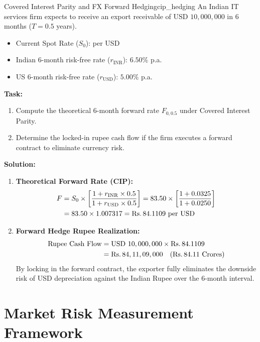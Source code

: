 \begin{example}{Covered Interest Parity and FX Forward Hedging}{cip_hedging}
An Indian IT services firm expects to receive an export receivable of $\text{USD } 10,000,000$ in 6 months ($T = 0.5$ years).
\begin{itemize}[leftmargin=1.5em, noitemsep]
    \item Current Spot Rate ($S_0$):  per USD
    \item Indian 6-month risk-free rate ($r_{\text{INR}}$): $6.50\%$ p.a.
    \item US 6-month risk-free rate ($r_{\text{USD}}$): $5.00\%$ p.a.
\end{itemize}

\textbf{Task:}
\begin{enumerate}[leftmargin=1.2em, itemsep=2pt]
    \item Compute the theoretical 6-month forward rate $F_{0, 0.5}$ under Covered Interest Parity.
    \item Determine the locked-in rupee cash flow if the firm executes a forward contract to eliminate currency risk.
\end{enumerate}

\textbf{Solution:}
\begin{enumerate}[leftmargin=1.2em, itemsep=2pt]
    \item \textbf{Theoretical Forward Rate (CIP):}
    \begin{align*}
    F &= S_0 \times \left[\frac{1 + r_{\text{INR}} \times 0.5}{1 + r_{\text{USD}} \times 0.5}\right] = 83.50 \times \left[\frac{1 + 0.0325}{1 + 0.0250}\right] \\
    &= 83.50 \times 1.007317 = \text{Rs.}\, 84.1109 \text{ per USD}
    \end{align*}
    \item \textbf{Forward Hedge Rupee Realization:}
    \begin{align*}
    \text{Rupee Cash Flow} &= \text{USD } 10,000,000 \times \text{Rs.}\, 84.1109 \\
    &= \text{Rs.}\, 84,11,09,000 \quad (\text{Rs.}\, 84.11 \text{ Crores})
    \end{align*}
    By locking in the forward contract, the exporter fully eliminates the downside risk of USD depreciation against the Indian Rupee over the 6-month interval.
\end{enumerate}
\end{example}

\section{Market Risk Measurement Framework}

